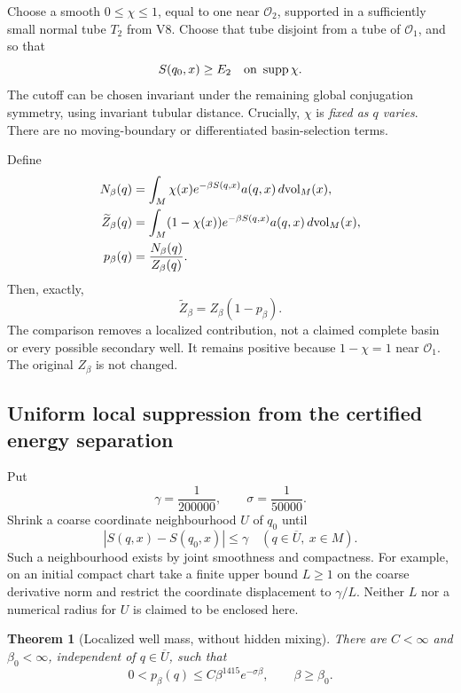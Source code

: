 \documentclass[11pt,oneside]{article}
\newtheorem{theorem}{Theorem}[section]
\begin{document}
Choose a smooth \(0\le\chi\le1\),
equal to one near \(\mathcal O_2\),
supported in a sufficiently small
normal tube \(T_2\) from V8. Choose
that tube disjoint from a tube of
\(\mathcal O_1\), and so that
\[
 S(q_0,x)\ge E_2
          \quad\hbox{on }\operatorname{supp}\chi .
\]
The cutoff can be chosen invariant
under the remaining global conjugation
symmetry, using invariant tubular
distance. Crucially, \(\chi\) is
\emph{fixed as \(q\) varies}. There
are no moving-boundary or differentiated
basin-selection terms.

Define
\[
\begin{split}
 N_\beta(q)&=\int_M\chi(x)
          e^{-\beta S(q,x)}a(q,x)\,d{\rm vol}_M(x),\\
 \widetilde Z_\beta(q)&=\int_M(1-\chi(x))
          e^{-\beta S(q,x)}a(q,x)\,d{\rm vol}_M(x),\\
 p_\beta(q)&=\frac{N_\beta(q)}{Z_\beta(q)}.
\end{split}
\]
Then, exactly,
\begin{equation}\label{eq:f13v9-exact}
 \widetilde Z_\beta=Z_\beta(1-p_\beta).
\end{equation}
The comparison removes a localized
contribution, not a claimed complete
basin or every possible secondary
well. It remains positive because
\(1-\chi=1\) near \(\mathcal O_1\).
The original \(Z_\beta\) is not changed.

\subsection{Uniform local suppression from the certified energy separation}

Put
\[
 \gamma=\frac1{200000},\qquad
 \sigma=\frac1{50000}.
\]
Shrink a coarse coordinate neighbourhood
\(U\) of \(q_0\) until
\begin{equation}\label{eq:f13v9-budget}
 |S(q,x)-S(q_0,x)|\le\gamma
             \quad(q\in\overline U,\ x\in M).
\end{equation}
Such a neighbourhood exists by joint
smoothness and compactness. For example,
on an initial compact chart take a
finite upper bound \(L\ge1\) on the
coarse derivative norm and restrict
the coordinate displacement to
\(\gamma/L\). Neither \(L\) nor a
numerical radius for \(U\) is claimed
to be enclosed here.

\begin{theorem}[Localized well mass, without hidden mixing]
\label{thm:f13v9-mass}
There are \(C<\infty\) and
\(\beta_0<\infty\), independent of
\(q\in\overline U\), such that
\begin{equation}\label{eq:f13v9-mass}
 0<p_\beta(q)\le
       C\beta^{1415}e^{-\sigma\beta},
 \qquad \beta\ge\beta_0 .
\end{equation}
\end{theorem}
\end{document}
